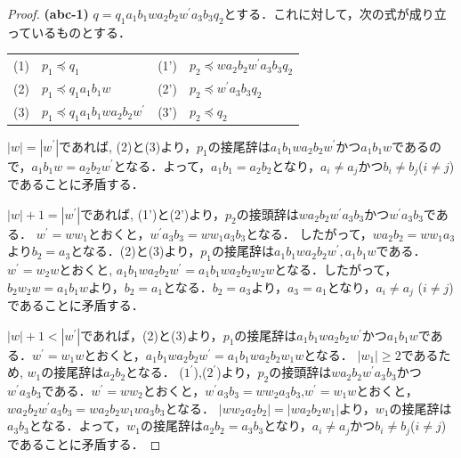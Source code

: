 \begin{proof}
\textbf{(abc-1)} $q=q_{1}a_{1}b_{1}wa_{2}b_{2}w^{\prime}a_{3}b_{3}q_{2}$とする．これに対して，次の式が成り立っているものとする．
\smallskip

\begin{tabular}{llll}
(1) & $p_{1} \preceq q_{1}$ & \hspace*{-30pt}(1') & \hspace*{-30pt}$p_{2} \preceq wa_{2}b_{2}w^{\prime}a_{3}b_{3}q_{2}$ \\
(2) & $p_{1} \preceq q_{1}a_{1}b_{1}w$ & \hspace*{-30pt}(2') & \hspace*{-30pt}$p_{2} \preceq w^{\prime}a_{3}b_{3}q_{2}$ \\
(3) & $p_{1} \preceq q_{1}a_{1}b_{1}wa_{2}b_{2}w^{\prime}$ & (3') & $p_{2} \preceq q_{2}$
\end{tabular}
\smallskip

$|w|=|w^{\prime}|$であれば, (2)と(3)より，$p_{1}$の接尾辞は$a_{1}b_{1}wa_{2}b_{2}w^{\prime}$かつ$a_{1}b_{1}w$であるので，$a_{1}b_{1}w=a_{2}b_{2}w^{\prime}$となる．よって，$a_{1}b_{1}=a_{2}b_{2}$となり，$a_{i} \ne a_{j}$かつ$b_{i} \ne b_{j}$($i \ne j$)であることに矛盾する．

$|w|+1=|w^{\prime}|$であれば, (1')と(2')より，$p_{2}$の接頭辞は$wa_{2}b_{2}w^{\prime}a_{3}b_{3}$かつ$w^{\prime}a_{3}b_{3}$である．
$w^{\prime}=ww_{1}$とおくと，$w^{\prime}a_{3}b_{3}=ww_{1}a_{3}b_{3}$となる．
したがって，$wa_{2}b_{2}=ww_{1}a_{3}$より$b_{2}=a_{3}$となる．(2)と(3)より，$p_{1}$の接尾辞は$a_{1}b_{1}wa_{2}b_{2}w^{\prime}, a_{1}b_{1}w$である．$w^{\prime}=w_{2}w$とおくと, $a_{1}b_{1}wa_{2}b_{2}w^{\prime}=a_{1}b_{1}wa_{2}b_{2}w_{2}w$となる．したがって，$b_{2}w_{2}w=a_{1}b_{1}w$より，$b_{2}=a_{1}$となる．$b_{2}=a_{3}$より，$a_{3}=a_{1}$となり，$a_{i} \ne a_{j}$ ($i \ne j$)であることに矛盾する．

$|w|+1 < |w^{\prime}|$であれば，(2)と(3)より，$p_{1}$の接尾辞は$a_{1}b_{1}wa_{2}b_{2}w^{\prime}$かつ$a_{1}b_{1}w$である．$w^{\prime}=w_{1}w$とおくと，$a_{1}b_{1}wa_{2}b_{2}w^{\prime}=a_{1}b_{1}wa_{2}b_{2}w_{1}w$となる．
$|w_{1}| \ge 2$であるため, $w_{1}$の接尾辞は$a_{2}b_{2}$となる．
($1^{\prime}$),($2^{\prime}$)より，$p_{2}$の接頭辞は$wa_{2}b_{2}w^{\prime}a_{3}b_{3}$かつ$w^{\prime}a_{3}b_{3}$である．$w^{\prime}=ww_{2}$とおくと，$w^{\prime}a_{3}b_{3}=ww_{2}a_{3}b_{3}$,$w^{\prime}=w_{1}w$とおくと，$wa_{2}b_{2}w^{\prime}a_{3}b_{3}=wa_{2}b_{2}w_{1}wa_{3}b_{3}$となる．
$|ww_{2}a_{2}b_{2}|=|wa_{2}b_{2}w_{1}|$より，$w_{1}$の接尾辞は$a_{3}b_{3}$となる．よって，$w_{1}$の接尾辞は$a_{2}b_{2}=a_{3}b_{3}$となり，$a_{i} \ne a_{j}$かつ$b_{i} \ne b_{j}$($i \ne j$)であることに矛盾する．
\smallskip


\end{proof}
